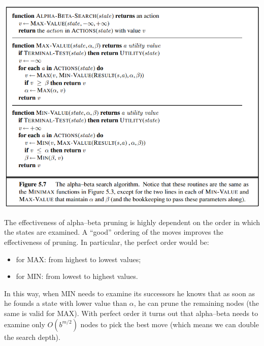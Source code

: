 \begin{center}
    \includegraphics[]{images/a-b algo.png}
\end{center}
The effectiveness of alpha–beta pruning is highly dependent on the order in which the states are examined. A “good” ordering of the moves improves the effectiveness of pruning. In particular, the perfect order would be:
\begin{itemize}
    \item for MAX: from highest to lowest values;
    \item for MIN:  from lowest to highest values.
\end{itemize}
In this way, when MIN needs to examine its successors he knows that as soon as he founds a state with lower value than $\alpha$, he can prune the remaining nodes (the same is valid for MAX). With perfect order it turns out that alpha–beta needs to examine only $O(b^{m/2})$ nodes to pick the best move (which means we can double the search depth).
